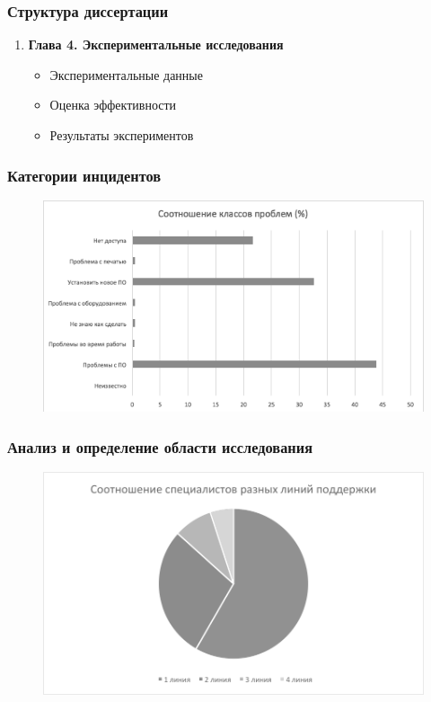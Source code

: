 \documentclass[14pt]{beamer}
\begin{document}
\begin{frame}
\frametitle{Структура диссертации}
\begin{enumerate}
 \item \textbf{Глава 4. Экспериментальные исследования}
  \begin{itemize}
    \item Экспериментальные данные
    \item Оценка эффективности
    \item Результаты экспериментов
  \end{itemize}

\end{enumerate}
\end{frame}


\begin{frame}
\frametitle{Категории инцидентов}
\begin{figure} [h] 
  \center
  \includegraphics [scale=0.6] {EngineerTasks}
  \label{img:EngineerTasks}  
\end{figure}
\end{frame}

\begin{frame}
\frametitle{Анализ и определение области исследования}
\begin{figure} [h] 
  \center
  \includegraphics [scale=0.7] {ITSMTeamComposition}
  \label{img:ITSMTeamComposition}  
\end{figure}

\end{frame}
\end{document}
